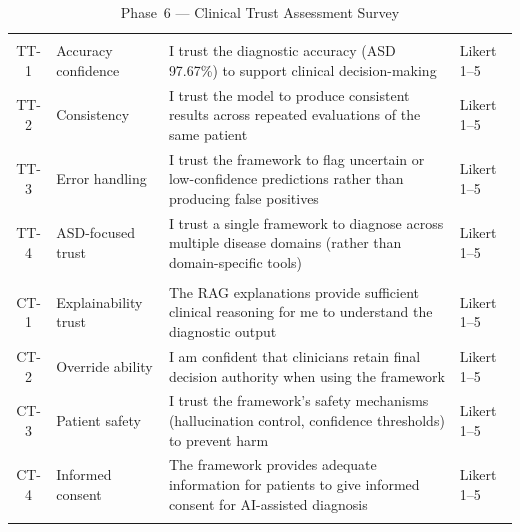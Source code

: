 \begin{xltabular}{\textwidth}{@{} c l X l @{}}
\caption{Phase~6 --- Clinical Trust Assessment Survey}
\label{tab:phase6_trust_survey}\\
\toprule
{} &  &  &  \\
\midrule
\endfirsthead
\endhead
\bottomrule
\endlastfoot
{} \\
\midrule
TT-1  & Accuracy confidence    & I trust the diagnostic accuracy (ASD 97.67\%) to support clinical decision-making & Likert 1--5 \\
\addlinespace
TT-2  & Consistency            & I trust the model to produce consistent results across repeated evaluations of the same patient & Likert 1--5 \\
\addlinespace
TT-3  & Error handling         & I trust the framework to flag uncertain or low-confidence predictions rather than producing false positives & Likert 1--5 \\
\addlinespace
TT-4  & ASD-focused trust     & I trust a single framework to diagnose across multiple disease domains (rather than domain-specific tools) & Likert 1--5 \\
\addlinespace
\midrule
{} \\
\midrule
CT-1  & Explainability trust   & The RAG explanations provide sufficient clinical reasoning for me to understand the diagnostic output & Likert 1--5 \\
\addlinespace
CT-2  & Override ability       & I am confident that clinicians retain final decision authority when using the framework & Likert 1--5 \\
\addlinespace
CT-3  & Patient safety         & I trust the framework's safety mechanisms (hallucination control, confidence thresholds) to prevent harm & Likert 1--5 \\
\addlinespace
CT-4  & Informed consent       & The framework provides adequate information for patients to give informed consent for AI-assisted diagnosis & Likert 1--5 \\
\addlinespace
\midrule
{} \\
\midrule

\end{xltabular}
